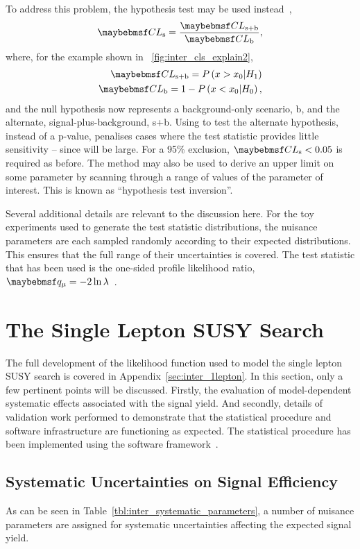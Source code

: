 To address this problem, the \CLs hypothesis test may be used instead~\cite{cls,confidence_level},
\begin{equation*}
\CLs = \frac{\CLspb}{\CLb},
\end{equation*}
where, for the example shown in \fig~\ref{fig:inter_cls_explain2},
\begin{eqnarray*}
\CLspb = P\left(x > x_0 | H_1\right)\\
\CLb = 1 - P\left(x < x_0 | H_0\right),
\end{eqnarray*}
and the null hypothesis now represents a background-only scenario, b, and the
alternate, signal-plus-background, s+b. Using \CLs to test the alternate
hypothesis, instead of a p-value, penalises cases where the test statistic
provides little sensitivity -- since \CLb will be large. For a 95\% exclusion,
$\CLs < 0.05$ is required as before. The \CLs method may also be used to derive
an upper limit on some parameter by scanning through a range of values of the
parameter of interest. This is known as ``hypothesis test inversion''.

Several additional details are relevant to the discussion here. For the toy
experiments used to generate the test statistic distributions, the nuisance
parameters are each sampled randomly according to their expected
distributions. This ensures that the full range of their uncertainties is
covered. The test statistic that has been used is the one-sided profile
likelihood ratio,
$\qmu=-2\ln\lambda$~\cite{cl_computation,modified_frequentist,atlas_cms_higgs,cl_asymptotic}.

\section{The Single Lepton \acl{SUSY} Search}
The full development of the likelihood function used to model the single lepton
\ac{SUSY} search is covered in Appendix~\ref{sec:inter_1lepton}. In this
section, only a few pertinent points will be discussed. Firstly, the evaluation
of model-dependent systematic effects associated with the signal yield. And
secondly, details of validation work performed to demonstrate that the
statistical procedure and software infrastructure are functioning as
expected. The statistical procedure has been implemented using the \roostats
software framework~\cite{roostats,roostats_web}.

\subsection{Systematic Uncertainties on Signal Efficiency}
As can be seen in Table~\ref{tbl:inter_systematic_parameters}, a number of
nuisance parameters are assigned for systematic uncertainties affecting the
expected signal yield.

